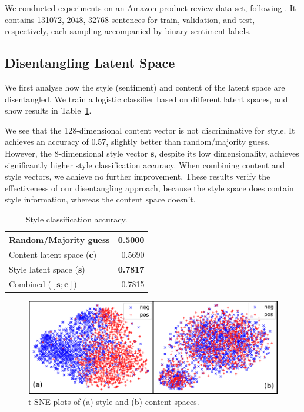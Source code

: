 We conducted experiments on an Amazon product review data-set, following \cite{fu2017style}. It contains 131072, 2048, 32768 sentences for train, validation, and test, respectively, each sampling accompanied by binary sentiment labels.

\subsection{Disentangling Latent Space}

We first analyse how the style (sentiment) and content of the latent space are disentangled. We train a logistic classifier based on different latent spaces, and show results in Table~\ref{tab:classification}.

We see that the 128-dimensional content vector is not discriminative for style. It achieves an accuracy of 0.57, slightly better than random/majority guess. However, the 8-dimensional style vector $\bm s$, despite its low dimensionality, achieves significantly higher style classification accuracy. When combining content and style vectors, we achieve no further improvement. These results verify the effectiveness of our disentangling approach, because the style space does contain style information, whereas the content space doesn't.


\begin{table}
	\centering
	\begin{tabular}{| l | r |}
		\hline
		Random/Majority guess           & 0.5000          \\ \hline
		Content latent space  ($\bm c$) & 0.5690          \\
		Style latent space ($\bm s$)    & \textbf{0.7817} \\
		Combined ($[\bm s;\bm c]$)      & 0.7815          \\
		\hline
	\end{tabular}
	\caption{Style classification accuracy.}
	\label{tab:classification}
\end{table}

\begin{figure}
	\includegraphics[width=\linewidth]{images/tsne-style-and-content}
	\caption{t-SNE plots of (a) style and (b) content spaces.}
	\label{fig:tsne}
\end{figure}


